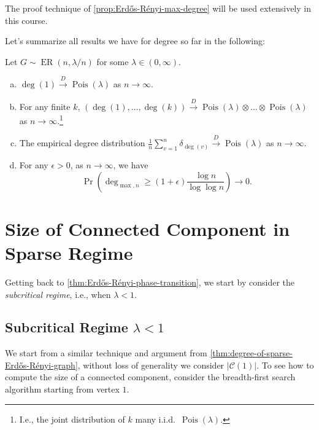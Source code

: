 \begin{remark}
	The proof technique of \autoref{prop:Erdős-Rényi-max-degree} will be used extensively in this course.
\end{remark}

Let's summarize all results we have for degree so far in the following:

\begin{theorem}\label{thm:degree-of-sparse-Erdős-Rényi-graph}
	Let \(G \sim \operatorname{ER}(n, \lambda / n) \) for some \(\lambda \in (0, \infty )\).
	\begin{enumerate}[(a)]
		\item\label{thm:degree-of-sparse-Erdős-Rényi-graph-a} \(\deg (1) \overset{D}{\to} \operatorname{Pois}(\lambda ) \) as \(n\to \infty \).
		\item\label{thm:degree-of-sparse-Erdős-Rényi-graph-b} For any finite \(k\), \((\deg (1), \dots , \deg (k)) \overset{D}{\to} \operatorname{Pois}(\lambda ) \otimes \dots \otimes \operatorname{Pois}(\lambda ) \) as \(n\to \infty \).\footnote{I.e., the joint distribution of \(k\) many i.i.d.\ \(\operatorname{Pois}(\lambda ) \).}
		\item\label{thm:degree-of-sparse-Erdős-Rényi-graph-c} The empirical degree distribution \(\frac{1}{n} \sum_{v=1}^{n} \delta _{\deg (v)} \overset{D}{\to} \operatorname{Pois}(\lambda ) \) as \(n\to \infty \).
		\item\label{thm:degree-of-sparse-Erdős-Rényi-graph-d} For any \(\epsilon > 0\), as \(n \to \infty \), we have
		      \[
			      \Pr_{}\left( \deg _{\max , n} \geq (1 + \epsilon ) \frac{\log n}{\log \log n} \right)
			      \to 0.
		      \]
	\end{enumerate}
\end{theorem}

\section{Size of Connected Component in Sparse Regime}
Getting back to \autoref{thm:Erdős-Rényi-phase-transition}, we start by consider the \emph{subcritical regime}, i.e., when \(\lambda < 1\).

\subsection{Subcritical Regime \(\lambda < 1\)}
We start from a similar technique and argument from \autoref{thm:degree-of-sparse-Erdős-Rényi-graph}, without loss of generality we consider \(\lvert \mathcal{C} (1) \rvert \). To see how to compute the size of a connected component, consider the breadth-first search algorithm starting from vertex \(1\).

